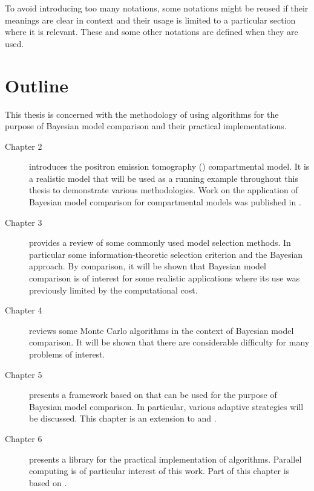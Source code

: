 To avoid introducing too many notations, some notations might be reused if
their meanings are clear in context and their usage is limited to a
particular section where it is relevant. These and some other notations are
defined when they are used.

\section{Outline}
\label{sec:Outline}

This thesis is concerned with the methodology of using \smc algorithms for the
purpose of Bayesian model comparison and their practical implementations.
\begin{description}
  \item[Chapter 2] introduces the positron emission tomography (\pet)
  compartmental model. It is a realistic model that will be used as a running
  example throughout this thesis to demonstrate various methodologies. Work
  on the application of Bayesian model comparison for \pet compartmental
  models was published in \cite{Zhou2013}.
  \item[Chapter 3] provides a review of some commonly used model selection
  methods. In particular some information-theoretic selection criterion and
  the Bayesian approach. By comparison, it will be shown that Bayesian model
  comparison is of interest for some realistic applications where its use was
  previously limited by the computational cost.
  \item[Chapter 4] reviews some Monte Carlo algorithms in the context of
  Bayesian model comparison. It will be shown that there are considerable
  difficulty for many problems of interest.
  \item[Chapter 5] presents a framework based on \smc that can be used for
  the purpose of Bayesian model comparison. In particular, various adaptive
  strategies will be discussed. This chapter is an extension to
  \cite{Zhou:2012uz} and \cite{Zhou:2013vx}.  
  \item[Chapter 6] presents a \cpp library for the practical implementation
  of \smc algorithms. Parallel computing is of particular interest of this
  work. Part of this chapter is based on \cite{vsmcjss}.
\end{description}
